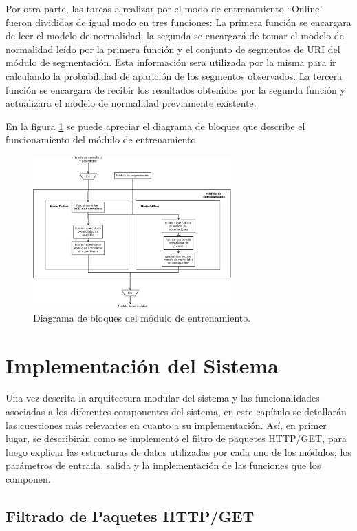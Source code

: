 Por otra parte, las tareas a realizar por el modo de entrenamiento ``Online'' fueron divididas de igual modo en tres funciones: La primera función se encargara de leer el modelo de normalidad; la segunda se encargará de tomar el modelo de normalidad leído por la primera función y el conjunto de segmentos de URI del módulo de segmentación. Esta información sera utilizada por la misma para ir calculando la probabilidad de aparición de los segmentos observados. La tercera función se encargara de recibir los resultados obtenidos por la segunda función y actualizara el modelo de normalidad previamente existente.

En la figura \ref{fig:arquiEntrenamiento} se puede apreciar el diagrama de bloques que describe el funcionamiento del módulo de entrenamiento.

\begin{figure}[!htb]
\begin{center}
\includegraphics[width=3in]{./img/entrenamArqui.jpeg}
\caption{Diagrama de bloques del módulo de entrenamiento.}
\label{fig:arquiEntrenamiento}
\end{center}
\end{figure}

\section{Implementación del Sistema}

Una vez descrita la arquitectura modular del sistema y las funcionalidades asociadas a los diferentes componentes del sistema, en este capítulo se detallarán las cuestiones más relevantes en cuanto a su implementación.
Así, en primer lugar, se describirán como se implementó el filtro de paquetes HTTP/GET, para luego explicar las estructuras de datos utilizadas por cada uno de los módulos; los parámetros de entrada, salida y la implementación de las funciones que los componen.

\subsection{Filtrado de Paquetes HTTP/GET}

